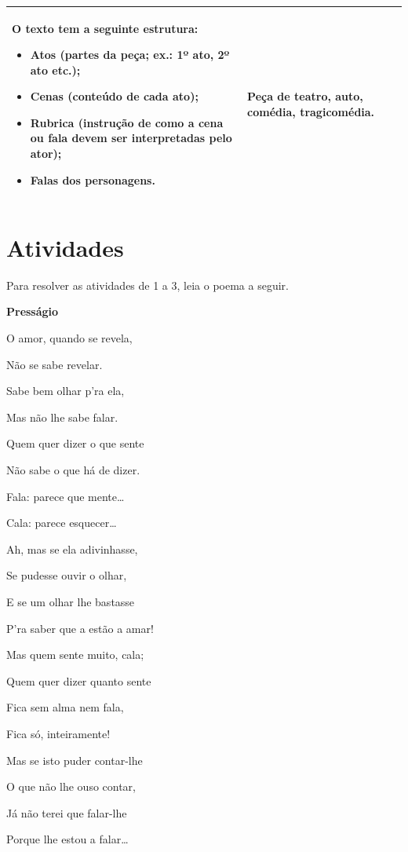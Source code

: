 \begin{longtable}[]{@{}lll@{}}
\begin{minipage}[t]{0.29\columnwidth}
O texto tem a seguinte estrutura:

\begin{itemize}
\item
  Atos (partes da peça; ex.: 1º  ato, 2º
  ato etc.);
\item
  Cenas (conteúdo de cada ato);
\item
  Rubrica (instrução de como a cena ou
  fala devem ser interpretadas
  pelo ator);
\item
  Falas dos personagens.
\end{itemize}\strut
\end{minipage} & \begin{minipage}[t]{0.29\columnwidth}\raggedright
Peça de teatro, auto, comédia, tragicomédia.\strut
\end{minipage}\tabularnewline
\bottomrule
\end{longtable}

\section*{Atividades}

Para resolver as atividades de 1 a 3, leia o poema a seguir.


\begin{myquote}
\textbf{Presságio}

O amor, quando se revela,

Não se sabe revelar.

Sabe bem olhar p'ra ela,

Mas não lhe sabe falar.

Quem quer dizer o que sente

Não sabe o que há de dizer.

Fala: parece que mente\ldots{}

Cala: parece esquecer\ldots{}

Ah, mas se ela adivinhasse,

Se pudesse ouvir o olhar,

E se um olhar lhe bastasse

P'ra saber que a estão a amar!

Mas quem sente muito, cala;

Quem quer dizer quanto sente

Fica sem alma nem fala,

Fica só, inteiramente!

Mas se isto puder contar-lhe

O que não lhe ouso contar,

Já não terei que falar-lhe

Porque lhe estou a falar\ldots{}

\end{myquote}

